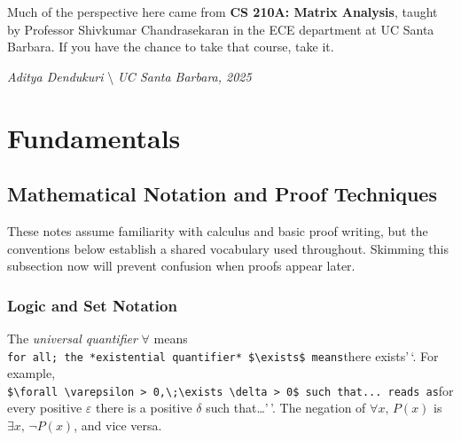 \documentclass[
  letterpaper,
]{scrbook}
\begin{document}
Much of the perspective here came from \textbf{CS 210A: Matrix
Analysis}, taught by Professor Shivkumar Chandrasekaran in the ECE
department at UC Santa Barbara. If you have the chance to take that
course, take it.

\emph{Aditya Dendukuri} \textbackslash{} \emph{UC Santa Barbara, 2025}

\part{Fundamentals}

\chapter{Mathematical Notation and Proof
Techniques}\label{mathematical-notation-and-proof-techniques}

These notes assume familiarity with calculus and basic proof writing,
but the conventions below establish a shared vocabulary used throughout.
Skimming this subsection now will prevent confusion when proofs appear
later.

\section{Logic and Set Notation}\label{logic-and-set-notation}

\begin{tcolorbox}[enhanced jigsaw, arc=.35mm, bottomrule=.15mm, bottomtitle=1mm, breakable, colback=white, colbacktitle=quarto-callout-note-color!10!white, colframe=quarto-callout-note-color-frame, coltitle=black, left=2mm, leftrule=.75mm, opacityback=0, opacitybacktitle=0.6, rightrule=.15mm, title={Definition: Logical Quantifiers}, titlerule=0mm, toprule=.15mm, toptitle=1mm]

The \emph{universal quantifier} \(\forall\) means
\texttt{for\ all\textquotesingle{}\textquotesingle{};\ the\ *existential\ quantifier*\ \$\textbackslash{}exists\$\ means}there
exists'\,`. For example,
\texttt{\$\textbackslash{}forall\ \textbackslash{}varepsilon\ \textgreater{}\ 0,\textbackslash{};\textbackslash{}exists\ \textbackslash{}delta\ \textgreater{}\ 0\$\ such\ that...\textquotesingle{}\textquotesingle{}\ reads\ as}for
every positive \(\varepsilon\) there is a positive \(\delta\) such
that\ldots{}'\,'. The negation of \(\forall x,\, P(x)\) is
\(\exists x,\, \neg P(x)\), and vice versa.

\end{tcolorbox}
\end{document}
